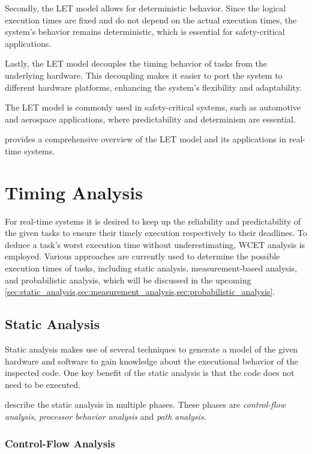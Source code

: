 Secondly, the \ac{LET} model allows for deterministic behavior. Since the logical execution times are fixed and do not depend on the actual execution times, the system's behavior remains deterministic, which is essential for safety-critical applications.

Lastly, the \ac{LET} model decouples the timing behavior of tasks from the underlying hardware. This decoupling makes it easier to port the system to different hardware platforms, enhancing the system's flexibility and adaptability.

The \ac{LET} model is commonly used in safety-critical systems, such as automotive and aerospace applications, where predictability and determinism are essential.

\textcite{kopetzRealTimeSystemsDesign2022} provides a comprehensive overview of the \ac{LET} model and its applications in real-time systems.


\section{Timing Analysis}\label{sec:timing_analysis}
For real-time systems it is desired to keep up the reliability and predictability of the given tasks to ensure their timely execution respectively to their deadlines.
To deduce a task's worst execution time without underestimating, \ac{WCET} analysis is employed.
Various approaches are currently used to determine the possible execution times of tasks, including static analysis, measurement-based analysis, and probabilistic analysis, which will be discussed in the upcoming \cref{sec:static_analysis,sec:measurement_analysis,sec:probabilistic_analysis}.

\subsection{Static Analysis}\label{sec:static_analysis}
Static analysis makes use of several techniques to generate a model of the given hardware and software to gain knowledge about the executional behavior of the inspected code.
One key benefit of the static analysis is that the code does not need to be executed.

\textcite{wilhelmWorstcaseExecutiontimeProblem2008} describe the static analysis in multiple phases.
These phases are \textit{control-flow analysis}, \textit{processor behavior analysis} and \textit{path analysis}.

\subsubsection{Control-Flow Analysis}\label{sec:cfa}

